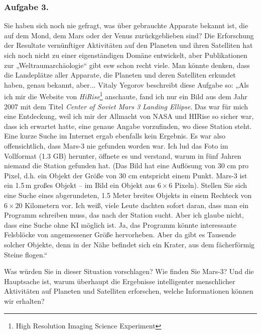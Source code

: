 \documentclass[11pt,a4paper]{article}
\begin{document}
\subsubsection*{Aufgabe 3.}
Sie haben sich noch nie gefragt, was über gebrauchte Apparate bekannt ist, die
auf dem Mond, dem Mars oder der Venus zurückgeblieben sind?  Die Erforschung
der Resultate vernünftiger Aktivitäten auf den Planeten und ihren Satelliten
hat sich noch nicht zu einer eigenständigen Domäne entwickelt, aber
Publikationen zur „Weltraumarchäologie“ gibt esw schon recht viele.  Man
könnte denken, dass die Landeplätze aller Apparate, die Planeten und deren
Satelliten erkundet haben, genau bekannt, aber... Vitaly Yegorov beschreibt
diese Aufgabe so: „Als ich mir die Website von \emph{HiRise}\footnote{High
  Resolution Imaging Science Experiment} anschaute, fand ich nur ein Bild aus
dem Jahr 2007 mit dem Titel \emph{Center of Soviet Mars 3 Landing Ellipse}.
Das war für mich eine Entdeckung, weil ich mir der Allmacht von NASA und
HIRise so sicher war, dass ich erwartet hatte, eine genaue Angabe vorzufinden,
wo diese Station steht.  Eine kurze Suche im Internet ergab ebenfalls kein
Ergebnis. Es war also offensichtlich, dass Mars-3 nie gefunden worden war. Ich
lud das Foto im Vollformat (1.3 GB) herunter, öffnete es und verstand, warum
in fünf Jahren niemand die Station gefunden hat. (Das Bild hat eine Auflösung
von 30 cm pro Pixel, d.h. ein Objekt der Größe von 30 cm entspricht einem
Punkt.  Mars-3 ist ein 1.5\,m großes Objekt -- im Bild ein Objekt aus
$6\times6$ Pixeln). Stellen Sie sich eine Suche eines abgerundeten, 1.5 Meter
breites Objekts in einem Rechteck von $6\times20$ Kilometern vor.  Ich weiß,
viele Leute dachten sofort daran, dass man ein Programm schreiben muss, das
nach der Station sucht. Aber ich glaube nicht, dass eine Suche ohne KI möglich
ist. Ja, das Programm könnte interessante Felsblöcke von angemessener Größe
hervorheben.  Aber da gibt es Tausende solcher Objekte, denn in der Nähe
befindet sich ein Krater, aus dem fächerförmig Steine flogen.“

Was würden Sie in dieser Situation vorschlagen? Wie finden Sie Mars-3? Und die
Hauptsache ist, warum überhaupt die Ergebnisse intelligenter menschlicher
Aktivitäten auf Planeten und Satelliten erforschen, welche Informationen
können wir erhalten?
\end{document}
